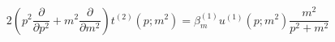 \begin{equation}
2 \left( p^2 \frac{\partial}{\partial p^2} + m^2
\frac{\partial}{\partial m^2} \right) t^{(2)} (p; m^2) = \beta_m^{(1)}
u^{(1)} (p;m^2) \frac{m^2}{p^2+m^2}
\end{equation}

